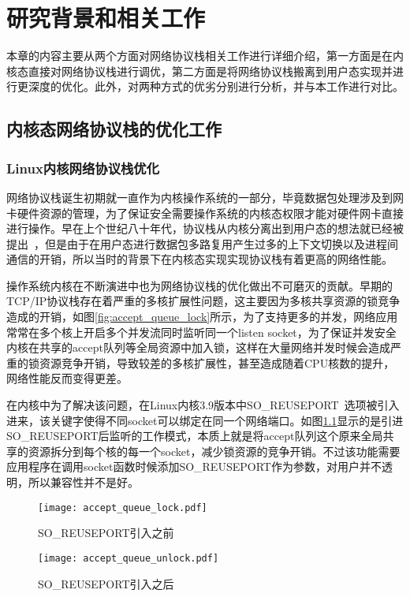 \chapter{研究背景和相关工作}
\label{cha:02_related_work}
本章的内容主要从两个方面对网络协议栈相关工作进行详细介绍，第一方面是在内核态直接对网络协议栈进行调优，第二方面是将网络协议栈搬离到用户态实现并进行更深度的优化。此外，对两种方式的优劣分别进行分析，并与本工作进行对比。

\section{内核态网络协议栈的优化工作}
\label{sec:02_kernel}

\subsection{Linux内核网络协议栈优化}
网络协议栈诞生初期就一直作为内核操作系统的一部分，毕竟数据包处理涉及到网卡硬件资源的管理，为了保证安全需要操作系统的内核态权限才能对硬件网卡直接进行操作。早在上个世纪八十年代，协议栈从内核分离出到用户态的想法就已经被提出~\cite{1987packer}，但是由于在用户态进行数据包多路复用产生过多的上下文切换以及进程间通信的开销，所以当时的背景下在内核态实现实现协议栈有着更高的网络性能。

操作系统内核在不断演进中也为网络协议栈的优化做出不可磨灭的贡献。早期的TCP/IP协议栈存在着严重的多核扩展性问题，这主要因为多核共享资源的锁竞争造成的开销，如图\ref{fig:accept_queue_lock}所示，为了支持更多的并发，网络应用常常在多个核上开启多个并发流同时监听同一个listen socket，为了保证并发安全内核在共享的accept队列等全局资源中加入锁，这样在大量网络并发时候会造成严重的锁资源竞争开销，导致较差的多核扩展性，甚至造成随着CPU核数的提升，网络性能反而变得更差。

在内核中为了解决该问题，在Linux内核3.9版本中SO\_REUSEPORT~\cite{SO_REUSEPORT}选项被引入进来，该关键字使得不同socket可以绑定在同一个网络端口。如图\ref{fig:accept_queue_unlock}显示的是引进SO\_REUSEPORT后监听的工作模式，本质上就是将accept队列这个原来全局共享的资源拆分到每个核的每一个socket，减少锁资源的竞争开销。不过该功能需要应用程序在调用socket函数时候添加SO\_REUSEPORT作为参数，对用户并不透明，所以兼容性并不是好。

\begin{figure}[htbp]
\centering
\begin{minipage}[t]{0.48\textwidth}
\centering
\texttt{[image: accept\_queue\_lock.pdf]}
\caption{SO\_REUSEPORT引入之前}
\label{fig:accept_queue_lock}
\end{minipage}
\begin{minipage}[t]{0.48\textwidth}
\centering
\texttt{[image: accept\_queue\_unlock.pdf]}
\caption{SO\_REUSEPORT引入之后}
\label{fig:accept_queue_unlock}
\end{minipage}
\end{figure}

